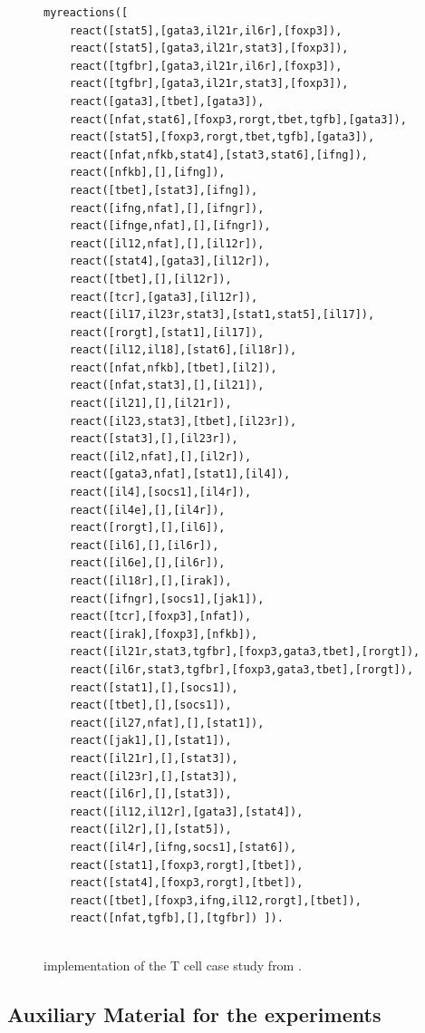 \begin{figure}[t]
\begin{minipage}{0.9\linewidth}
\footnotesize
\begin{verbatim}
myreactions([
    react([stat5],[gata3,il21r,il6r],[foxp3]),
    react([stat5],[gata3,il21r,stat3],[foxp3]),
    react([tgfbr],[gata3,il21r,il6r],[foxp3]),
    react([tgfbr],[gata3,il21r,stat3],[foxp3]),
    react([gata3],[tbet],[gata3]),
    react([nfat,stat6],[foxp3,rorgt,tbet,tgfb],[gata3]),
    react([stat5],[foxp3,rorgt,tbet,tgfb],[gata3]),
    react([nfat,nfkb,stat4],[stat3,stat6],[ifng]),
    react([nfkb],[],[ifng]),
    react([tbet],[stat3],[ifng]),
    react([ifng,nfat],[],[ifngr]),
    react([ifnge,nfat],[],[ifngr]),
    react([il12,nfat],[],[il12r]),
    react([stat4],[gata3],[il12r]),
    react([tbet],[],[il12r]),
    react([tcr],[gata3],[il12r]),
    react([il17,il23r,stat3],[stat1,stat5],[il17]),
    react([rorgt],[stat1],[il17]),
    react([il12,il18],[stat6],[il18r]),
    react([nfat,nfkb],[tbet],[il2]),
    react([nfat,stat3],[],[il21]),
    react([il21],[],[il21r]),
    react([il23,stat3],[tbet],[il23r]),
    react([stat3],[],[il23r]),
    react([il2,nfat],[],[il2r]),
    react([gata3,nfat],[stat1],[il4]),
    react([il4],[socs1],[il4r]),
    react([il4e],[],[il4r]),
    react([rorgt],[],[il6]),
    react([il6],[],[il6r]),
    react([il6e],[],[il6r]),
    react([il18r],[],[irak]),
    react([ifngr],[socs1],[jak1]),
    react([tcr],[foxp3],[nfat]),
    react([irak],[foxp3],[nfkb]),
    react([il21r,stat3,tgfbr],[foxp3,gata3,tbet],[rorgt]),
    react([il6r,stat3,tgfbr],[foxp3,gata3,tbet],[rorgt]),
    react([stat1],[],[socs1]),
    react([tbet],[],[socs1]),
    react([il27,nfat],[],[stat1]),
    react([jak1],[],[stat1]),
    react([il21r],[],[stat3]),
    react([il23r],[],[stat3]),
    react([il6r],[],[stat3]),
    react([il12,il12r],[gata3],[stat4]),
    react([il2r],[],[stat5]),
    react([il4r],[ifng,socs1],[stat6]),
    react([stat1],[foxp3,rorgt],[tbet]),
    react([stat4],[foxp3,rorgt],[tbet]),
    react([tbet],[foxp3,ifng,il12,rorgt],[tbet]),
    react([nfat,tgfb],[],[tgfbr]) ]).
    
\end{verbatim}
\end{minipage}
\caption{\BioResolve implementation of the T cell case study from .}
\label{fig:bioresolve:tcell}
\end{figure}

\subsection{Auxiliary Material for the \GROOVE experiments}\label{app:groove}

